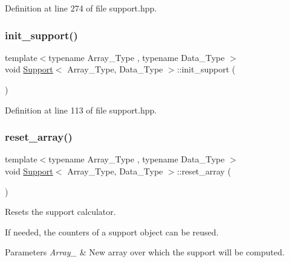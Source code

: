 Definition at line 274 of file support.\+hpp.

\mbox{\label{class_support_aef6fda6e7a0989f53fcd252609d770c9}} 
\subsubsection{\texorpdfstring{init\+\_\+support()}{init\_support()}}
{\footnotesize\ttfamily template$<$typename Array\+\_\+\+Type , typename Data\+\_\+\+Type $>$ \\
void \hyperlink{class_support}{Support}$<$ Array\+\_\+\+Type, Data\+\_\+\+Type $>$\+::init\+\_\+support (\begin{DoxyParamCaption}{ }\end{DoxyParamCaption})\hspace{0.3cm}{\ttfamily [inline]}}



Definition at line 113 of file support.\+hpp.

\mbox{\label{class_support_a831220076ece01ef72abce7c700b6d9b}} 
\subsubsection{\texorpdfstring{reset\+\_\+array()}{reset\_array()}\hspace{0.1cm}{\footnotesize\ttfamily [1/2]}}
{\footnotesize\ttfamily template$<$typename Array\+\_\+\+Type , typename Data\+\_\+\+Type $>$ \\
void \hyperlink{class_support}{Support}$<$ Array\+\_\+\+Type, Data\+\_\+\+Type $>$\+::reset\+\_\+array (\begin{DoxyParamCaption}{ }\end{DoxyParamCaption})\hspace{0.3cm}{\ttfamily [inline]}}



Resets the support calculator. 

If needed, the counters of a support object can be reused.


\begin{DoxyParams}{Parameters}
{\em Array\+\_\+} & New array over which the support will be computed. \\
\hline
\end{DoxyParams}


